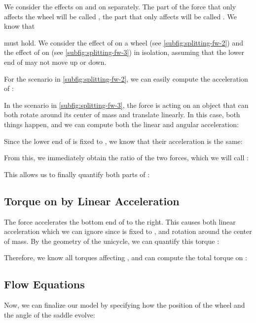\documentclass[copyright,submission]{eptcs}
\begin{document}
We consider the effects on  and on  separately. The part of the force that only affects the wheel will be called , the part that only affects  will be called . We know that

must hold. We consider the effect of  on a wheel (see \cref{subfig:splitting-fw-2}) and the effect of  on  (see \cref{subfig:splitting-fw-3}) in isolation, assuming that the lower end of  may not move up or down.

For the scenario in \cref{subfig:splitting-fw-2}, we can easily compute the acceleration of :


In the scenario in \cref{subfig:splitting-fw-3}, the force  is acting on an object that can both rotate around its center of mass and translate linearly. In this case, both things happen, and we can compute both the linear and angular acceleration:


Since the lower end of  is fixed to , we know that their acceleration is the same:


From this, we immediately obtain the ratio of the two forces, which we will call :


This allows us to finally quantify both parts of :



\subsection{Torque on \texorpdfstring{}{S} by Linear Acceleration}

The force  accelerates the bottom end of  to the right. This causes both linear acceleration which we can ignore since  is fixed to , and rotation around the center of mass. By the geometry of the unicycle, we can quantify this torque :


Therefore, we know all torques affecting , and can compute the total torque on :



\subsection{Flow Equations}

Now, we can finalize our model by specifying how the position  of the wheel and the angle  of the saddle evolve:
\end{document}
